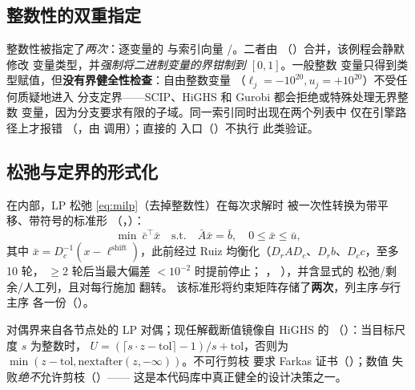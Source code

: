 \documentclass[11pt]{ctexart}
\begin{document}
\subsection{整数性的双重指定}
\label{sec:dual-integrality}
整数性被指定了\emph{两次}：逐变量的 
与索引向量 /。二者由
（）合并，该例程会静默修改
变量类型，并\emph{强制将二进制变量的界钳制到 $[0,1]$}。一般整数
变量只得到类型赋值，但\textbf{没有界健全性检查}：自由整数变量
（$\ell_j=-10^{20}, u_j=+10^{20}$）不受任何质疑地进入
分支定界——SCIP、HiGHS 和 Gurobi 都会拒绝或特殊处理无界整数
变量，因为分支要求有限的子域。同一索引同时出现在两个列表中
仅在引擎路径上才报错
（，由
 调用）；直接的 
入口（）不执行
此类验证。

\subsection{松弛与定界的形式化}
在内部，LP 松弛 \eqref{eq:milp}（去掉整数性）在每次求解时
被一次性转换为带平移、带符号的标准形
（，）：
\begin{equation}
\min\ \bar c^\top \bar x \quad \text{s.t.}\quad
\bar A \bar x = \bar b,\quad 0 \le \bar x \le \bar u,
\label{eq:sf}
\end{equation}
其中 $\bar x = D_c^{-1}(x - \ell^{\mathrm{shift}})$，此前经过 Ruiz
均衡化（$D_r A D_c$、$D_r b$、$D_c c$，至多 10 轮，
$\ge$2 轮后当最大偏差 $<10^{-2}$ 时提前停止；
，
），并含显式的
松弛/剩余/人工列，且对每行施加  翻转。
该标准形将约束矩阵存储了\textbf{两次}，列主序\emph{与}行主序
各一份（）。

对偶界来自各节点处的 LP 对偶；现任解截断值镜像自
HiGHS 的 
（）：当目标尺度 $s$ 为整数时，
$U = (\lceil s\cdot z - \mathrm{tol}\rceil - 1)/s + \mathrm{tol}$，否则为
$\min(z - \mathrm{tol}, \mathrm{nextafter}(z, -\infty))$。不可行剪枝
要求 Farkas 证书（）；数值
失败\emph{绝不}允许剪枝（）——
这是本代码库中真正健全的设计决策之一。

\end{document}
